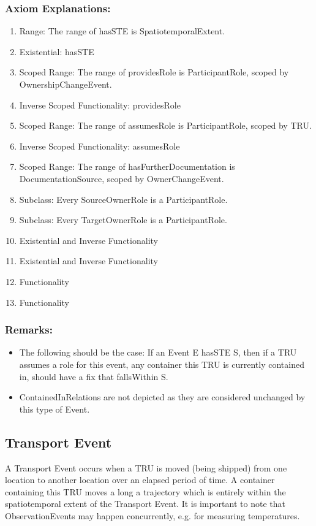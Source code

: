 \subsubsection*{Axiom Explanations:}
\begin{enumerate}
    \item Range: The range of \textsf{hasSTE} is \textsf{SpatiotemporalExtent}.
    \item Existential: \textsf{hasSTE}
    \item Scoped Range: The range of \textsf{providesRole} is \textsf{ParticipantRole}, scoped by \textsf{OwnershipChangeEvent}.
    \item Inverse Scoped Functionality: \textsf{providesRole}
    \item Scoped Range: The range of \textsf{assumesRole} is \textsf{ParticipantRole}, scoped by \textsf{TRU}.
    \item Inverse Scoped Functionality: \textsf{assumesRole}
    \item Scoped Range: The range of \textsf{hasFurtherDocumentation} is \textsf{DocumentationSource}, scoped by \textsf{OwnerChangeEvent}.
    \item Subclass: Every \textsf{SourceOwnerRole} is a \textsf{ParticipantRole}.
    \item Subclass: Every \textsf{TargetOwnerRole} is a \textsf{ParticipantRole}.
    \item Existential and Inverse Functionality
    \item Existential and Inverse Functionality
    \item Functionality 
    \item Functionality
\end{enumerate}

\subsubsection{Remarks:}
\begin{itemize}
    \item The following should be the case: If an Event E hasSTE S, then if a TRU assumes a role for this event, any container this TRU is currently contained in, should have a fix that fallsWithin S.
    \item ContainedInRelations are not depicted as they are considered unchanged by this type of Event.
\end{itemize}

\subsection{Transport Event}
\label{ssec:ocrec}
A Transport Event occurs when a TRU is moved (being shipped) from one location to another location over an elapsed period of time. A container containing this TRU moves a long a trajectory which is entirely within the spatiotemporal extent of the Transport Event. It is important to note that ObservationEvents may happen concurrently, e.g. for measuring temperatures. 

